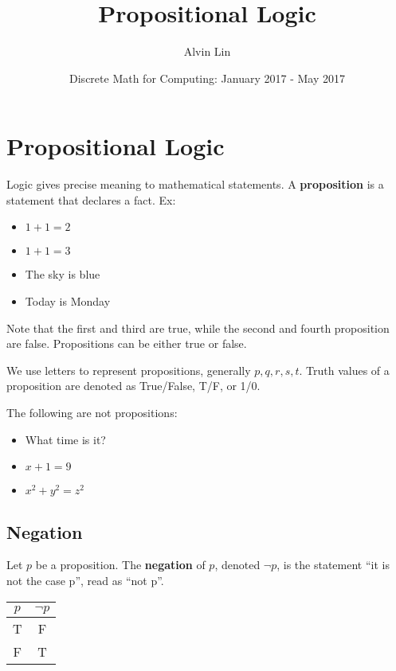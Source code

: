 \documentclass{math}
\title{Propositional Logic}
\author{Alvin Lin}
\date{Discrete Math for Computing: January 2017 - May 2017}
\begin{document}
\maketitle

\section*{Propositional Logic}
Logic gives precise meaning to mathematical statements. A \textbf{proposition}
is a statement that declares a fact. Ex:
\begin{itemize}
  \item \( 1+1 = 2 \)
  \item \( 1+1 = 3 \)
  \item The sky is blue
  \item Today is Monday
\end{itemize}
Note that the first and third are true, while the second and fourth proposition
are false. Propositions can be either true or false. \par
We use letters to represent propositions, generally \(p, q, r, s, t\). Truth
values of a proposition are denoted as True/False, T/F, or 1/0. \par
The following are not propositions:
\begin{itemize}
  \item What time is it?
  \item \( x+1 = 9 \)
  \item \( x^{2}+y^{2} = z^{2} \)
\end{itemize}

\subsection*{Negation}
Let \( p \) be a proposition. The \textbf{negation} of \( p \), denoted
\( \neg{p} \), is the statement ``it is not the case p'', read as ``not p''.
\begin{center}
  \begin{tabular}{|c|c|}
    \hline
    \( p \) & \( \neg{p} \) \\ \hline
    T       & F             \\ \hline
    F       & T             \\ \hline
  \end{tabular}
\end{center}
\end{document}
